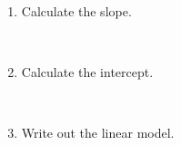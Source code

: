 \documentclass[11pt]{article}
\newcommand{\soln}[2]{$\:$\\ \vspace{#1}}{}
\begin{document}
\begin{enumerate}

\item Calculate the slope.

\soln{1cm}{$b_1 = R \times \frac{s_y}{s_x} = 0.84 * \frac{9.88}{3.24} = 2.56$}

\item Calculate the intercept.

\soln{1cm}{$b_0 = \bar{y} - b_1 \times \bar{x} = 20.57 - 0.84 * 19.72 = 4$}

\item Write out the linear model.

\soln{1cm}{$\widehat{murder} = 4 + 2.56~poverty$}

\end{enumerate}
\end{document}
